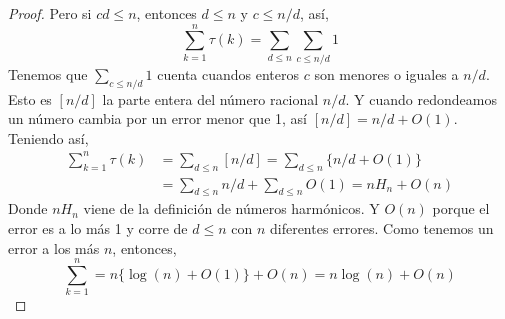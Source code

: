 \documentclass[letterpaper]{article}
\begin{document}
\begin{enumerate}
\begin{proof}
Pero si $cd \leq n$, entonces $d \leq n$ y $c \leq n/d$, así,
\[
    \sum_{k=1}^{n} \tau(k) = \sum_{d \leq n} \sum_{c \leq n/d} 1
\]
Tenemos que $\sum_{c \leq n/d} 1$ cuenta cuandos enteros $c$ son menores o iguales a $n/d$. Esto es $[n/d]$ la
parte entera del número racional $n/d$. Y cuando redondeamos un número cambia por un error menor que 1,
así $[n/d] = n/d + O(1)$. Teniendo así,
\begin{align*}
    \sum_{k=1}^{n} \tau(k)
        &= \sum_{d \leq n} [n/d] = \sum_{d \leq n} \{ n/d + O(1) \}\\
        &= \sum_{d \leq n} n/d + \sum_{d \leq n} O(1) = nH_n + O(n)
\end{align*}
Donde $nH_n$ viene de la definición de números harmónicos. Y $O(n)$ porque el error es a lo más 1 y corre de
$d \leq n$ con $n$ diferentes errores. Como tenemos un error a los más $n$, entonces,
\[
    \sum_{k=1}^{n} = n \{ \log(n)+O(1) \} + O(n) = n\log(n) + O(n)
\]
\end{proof}

\end{enumerate}






\end{document}

